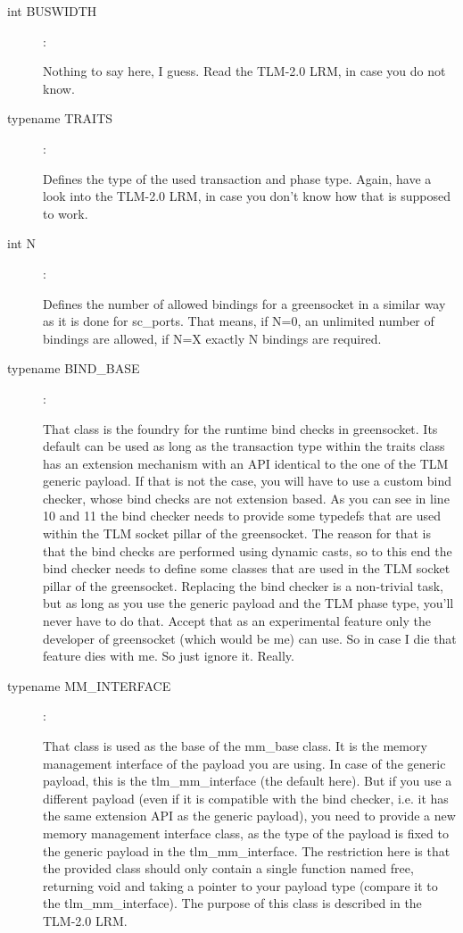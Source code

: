 \documentclass[a4paper,10pt]{article}          %
\newcommand{\code}[1]{{\ttfamily#1}}
\begin{document}
\begin{description}
\item[\code{int BUSWIDTH}]:

Nothing to say here, I guess. Read the TLM-2.0 LRM, in case you do not know.
\item[\code{typename TRAITS}]:  

Defines the type of the used transaction and phase type. Again, have a look into the TLM-2.0 LRM, in case you don't know how that is supposed to work.

\item[\code{int N}]:

Defines the number of allowed bindings for a greensocket in a similar way as it is done for \code{sc\_port}s. That means, if N=0, an unlimited number of bindings are allowed, if N=X exactly N bindings are required.

\item[\code{typename BIND\_BASE}]: 

That class is the foundry for the runtime bind checks in greensocket. Its default can be used as long as the transaction type within the traits class has an extension mechanism with an API identical to the one of the TLM generic payload. If that is not the case, you will have to use a custom bind checker, whose bind checks are not extension based. As you can see in line 10 and 11 the bind checker needs to provide some typedefs that are used within the TLM socket pillar of the greensocket. The reason for that is that the bind checks are performed using dynamic casts, so to this end the bind checker needs to define some classes that are used in the TLM socket pillar of the greensocket. Replacing the bind checker is a non-trivial task, but as long as you use the generic payload and the TLM phase type, you'll never have to do that. Accept that as an experimental feature only the developer of greensocket (which would be me) can use. So in case I die that feature dies with me. So just ignore it. Really.

\item[\code{typename MM\_INTERFACE}]:

That class is used as the base of the \code{mm\_base} class. It is the memory management interface of the payload you are using. In case of the generic payload, this is the \code{tlm\_mm\_interface} (the default here). But if you use a different payload (even if it is compatible with the bind checker, i.e. it has the same extension API as the generic payload), you need to provide a new  memory management interface class, as the type of the payload is fixed to the generic payload in the \code{tlm\_mm\_interface}. The restriction here is that the provided class should only contain a single function named \code{free}, returning \code{void} and taking a pointer to your payload type (compare it to the \code{tlm\_mm\_interface}). The purpose of this class is described in the TLM-2.0 LRM.


\end{description}
\end{document}
